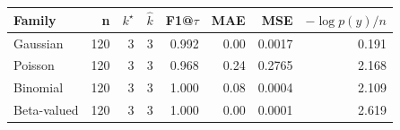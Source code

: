 \begin{tabular}{lrrrrrrr}\toprule
Family & n & $k^\star$ & $\hat{k}$ & F1@$\tau$ & MAE & MSE & $-\log p(y)/n$\\\midrule
Gaussian & 120 & 3 & 3 & 0.992 & 0.00 & 0.0017 & 0.191\\
Poisson & 120 & 3 & 3 & 0.968 & 0.24 & 0.2765 & 2.168\\
Binomial & 120 & 3 & 3 & 1.000 & 0.08 & 0.0004 & 2.109\\
Beta-valued & 120 & 3 & 3 & 1.000 & 0.00 & 0.0001 & 2.619\\
\bottomrule\end{tabular}
